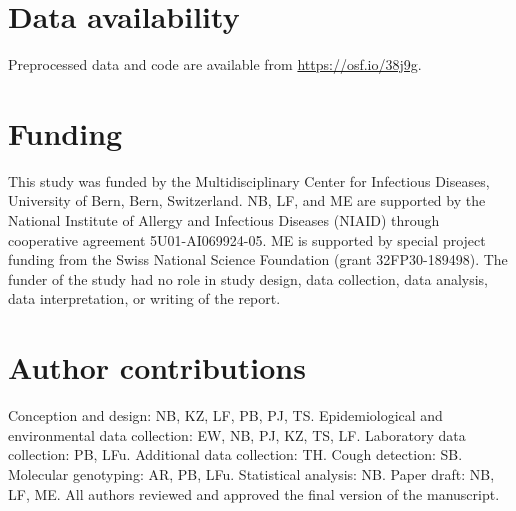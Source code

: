 \documentclass[fleqn,11pt]{wlscirep}
\begin{document}
\section*{Data availability}
Preprocessed data and code are available from \url{https://osf.io/38j9g}.

\section*{Funding}
This study was funded by the Multidisciplinary Center for Infectious Diseases, University of Bern, Bern, Switzerland. NB, LF, and ME are supported by the National Institute of Allergy and Infectious Diseases (NIAID) through cooperative agreement 5U01-AI069924-05. ME is supported by special project funding from the Swiss National Science Foundation (grant 32FP30-189498). The funder of the study had no role in study design, data collection, data analysis, data interpretation, or writing of the report.

\section*{Author contributions}
Conception and design: NB, KZ, LF, PB, PJ, TS. Epidemiological and environmental data collection: EW, NB, PJ, KZ, TS, LF. Laboratory data collection: PB, LFu. Additional data collection: TH. Cough detection: SB. Molecular genotyping: AR, PB, LFu. Statistical analysis: NB. Paper draft: NB, LF, ME. All authors reviewed and approved the final version of the manuscript.


\clearpage



\clearpage
\end{document}
